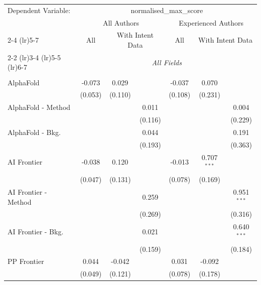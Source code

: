 \begingroup
\centering
\begin{tabular}{lcccccc}
   \tabularnewline \midrule \midrule
   Dependent Variable: & \multicolumn{6}{c}{normalised\_max\_score}\\
 & \multicolumn{3}{c}{All Authors} & \multicolumn{3}{c}{Experienced Authors} \\
\cmidrule(lr){2-4} \cmidrule(lr){5-7}
 & \multicolumn{1}{c}{All} & \multicolumn{2}{c}{With Intent Data} & \multicolumn{1}{c}{All} & \multicolumn{2}{c}{With Intent Data} \\
\cmidrule(lr){2-2} \cmidrule(lr){3-4} \cmidrule(lr){5-5} \cmidrule(lr){6-7}
 & \multicolumn{6}{c}{\textit{All Fields}} \\ \\
   AlphaFold            & -0.073  & 0.029   &         & -0.037  & 0.070         &   \\   
                        & (0.053) & (0.110) &         & (0.108) & (0.231)       &   \\   
   AlphaFold - Method   &         &         & 0.011   &         &               & 0.004\\   
                        &         &         & (0.116) &         &               & (0.229)\\   
   AlphaFold - Bkg.     &         &         & 0.044   &         &               & 0.191\\   
                        &         &         & (0.193) &         &               & (0.363)\\   
   AI Frontier          & -0.038  & 0.120   &         & -0.013  & 0.707$^{***}$ &   \\   
                        & (0.047) & (0.131) &         & (0.078) & (0.169)       &   \\   
   AI Frontier - Method &         &         & 0.259   &         &               & 0.951$^{***}$\\   
                        &         &         & (0.269) &         &               & (0.316)\\   
   AI Frontier - Bkg.   &         &         & 0.021   &         &               & 0.640$^{***}$\\   
                        &         &         & (0.159) &         &               & (0.184)\\   
   PP Frontier          & 0.044   & -0.042  &         & 0.031   & -0.092        &   \\   
                        & (0.049) & (0.121) &         & (0.078) & (0.178)       &   \\   

\end{tabular}
